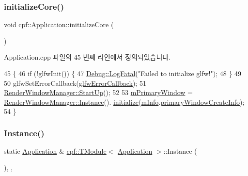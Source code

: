 \subsubsection{\texorpdfstring{initialize\+Core()}{initializeCore()}}
{\footnotesize\ttfamily void cpf\+::\+Application\+::initialize\+Core (\begin{DoxyParamCaption}{ }\end{DoxyParamCaption})\hspace{0.3cm}{\ttfamily [private]}}



Application.\+cpp 파일의 45 번째 라인에서 정의되었습니다.


\begin{DoxyCode}
45                                      \{
46         \textcolor{keywordflow}{if} (!glfwInit()) \{
47             \hyperlink{classcpf_1_1_debug_a22849847c74bcb444922c263c9ae6183}{Debug::LogFatal}(\textcolor{stringliteral}{"Failed to initialize glfw!"});
48         \}
49 
50         glfwSetErrorCallback(\hyperlink{namespacecpf_a2aa8b9856909234833858da9b6c466dd}{glfwErrorCallback});
51         \hyperlink{classcpf_1_1_t_module_a02fbf3c4d28a3328e81b0e8d0bdd93b0}{RenderWindowManager::StartUp}();
52 
53         \hyperlink{classcpf_1_1_application_a112167287be2ff0ee64a793c6a93fa3d}{mPrimaryWindow} = \hyperlink{classcpf_1_1_t_module_ac8065254584cb0a6656c42f96859d190}{RenderWindowManager::Instance}().
      \hyperlink{classcpf_1_1_render_window_manager_a9e198c25b9f2eb5dd5b248e47532677d}{initialize}(\hyperlink{classcpf_1_1_application_aeef620fe71f2ac891e3650d6d3462b28}{mInfo}.\hyperlink{structcpf_1_1_application_create_info_a1cd605f921ac5ac29474cbe52f7ea499}{primaryWindowCreateInfo});
54     \}
\end{DoxyCode}
\mbox{\label{classcpf_1_1_t_module_ac8065254584cb0a6656c42f96859d190}} 
\subsubsection{\texorpdfstring{Instance()}{Instance()}}
{\footnotesize\ttfamily static \hyperlink{classcpf_1_1_application}{Application} \& \hyperlink{classcpf_1_1_t_module}{cpf\+::\+T\+Module}$<$ \hyperlink{classcpf_1_1_application}{Application}  $>$\+::Instance (\begin{DoxyParamCaption}{ }\end{DoxyParamCaption})\hspace{0.3cm}{\ttfamily [inline]}, {\ttfamily [static]}, {\ttfamily [inherited]}}

